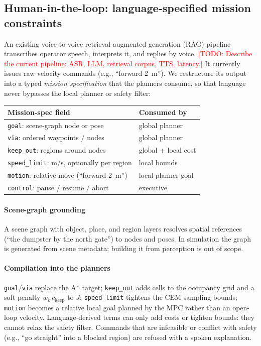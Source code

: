 \documentclass[conference]{IEEEtran}
\newcommand{\todo}[1]{\textcolor{red}{[TODO: #1]}}
\begin{document}
\subsection{Human-in-the-loop: language-specified mission constraints}
An existing voice-to-voice retrieval-augmented generation (RAG) pipeline
transcribes operator speech, interprets it, and replies by voice.
\todo{Describe the current pipeline: ASR, LLM, retrieval corpus, TTS,
latency.} It currently issues raw velocity commands (e.g., ``forward
2~m''). We restructure its output into a typed \emph{mission
specification} that the planners consume, so that language never
bypasses the local planner or safety filter:
\begin{center}
\begin{tabular}{@{}ll@{}}
\toprule
Mission-spec field & Consumed by \\
\midrule
\texttt{goal}: scene-graph node or pose & global planner \\
\texttt{via}: ordered waypoints / nodes & global planner \\
\texttt{keep\_out}: regions around nodes & global + local cost \\
\texttt{speed\_limit}: m/s, optionally per region & local bounds \\
\texttt{motion}: relative move (``forward 2~m'') & local planner goal \\
\texttt{control}: pause / resume / abort & executive \\
\bottomrule
\end{tabular}
\end{center}
\paragraph{Scene-graph grounding}
A scene graph with object, place, and region layers
\cite{armeni2019scenegraph,hughes2022hydra} resolves spatial references
(``the dumpster by the north gate'') to nodes and poses. In simulation
the graph is generated from scene metadata; building it from perception
\cite{gu2024conceptgraphs} is out of scope.
\paragraph{Compilation into the planners}
\texttt{goal}/\texttt{via} replace the A* target; \texttt{keep\_out}
adds cells to the occupancy grid and a soft penalty $w_k\,c_{\text{keep}}$
to $J$; \texttt{speed\_limit} tightens the CEM sampling bounds;
\texttt{motion} becomes a relative local goal planned by the MPC rather
than an open-loop velocity. Language-derived terms can only add costs
or tighten bounds: they cannot relax the safety filter. Commands that
are infeasible or conflict with safety (e.g., ``go straight'' into a
blocked region) are refused with a spoken explanation.
\end{document}
